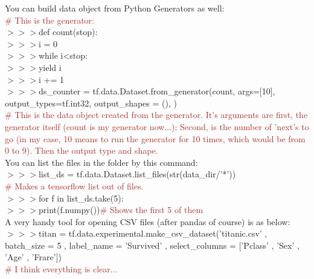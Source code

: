 \documentclass[a4paper,18pt]{article}
\begin{document}
{{{{{{{{{{{{{{{{{{{{{{{{{{You can build data object from Python Generators as well:\\

{\textcolor{brown}{\# This is the generator:}}\\

$>>>$def count(stop):\\

$>>>$\hspace*{14pt}i = 0\\

$>>>$\hspace*{14pt}while i<stop:\\

$>>>$\hspace*{28pt}yield i\\

$>>>$\hspace*{28pt}i += 1\\

$>>>$ds\_counter = tf.data.Dataset.from\_generator(count, args=[10], output\_types=tf.int32, output\_shapes = (), )\\

{\textcolor{brown}{\# This is the data object created from the generator. It's arguments are first, the generator itself (count is my generator now...); Second, is the number of 'next's to go (in my case, 10 means to run the generator for 10 times, which would be from 0 to 9). Then the output type and shape.}}\\

You can list the files in the folder by this command:\\

$>>>$list\_ds = tf.data.Dataset.list\_files(str(data\_dir/'*'))\\{\textcolor{brown}{\# Makes a tensorflow list out of files.}}\\

$>>>$for f in list\_ds.take(5):\\

$>>>$\hspace*{14pt}print(f.numpy()){\textcolor{brown}{\# Shows the first 5 of them}}\\

A very handy tool for opening CSV files (after pandas of course) is as below:\\

$>>>$titan = tf.data.experimental.make\_csv\_dataset('titanic.csv' , batch\_size = 5  , label\_name = 'Survived' , select\_columns = ['Pclass' , 'Sex' , 'Age' , 'Frare'])\\{\textcolor{brown}{\# I think everything is clear...}}\\

}}}}}}}}}}}}}}}}}}}}}}}}}}
\end{document}
